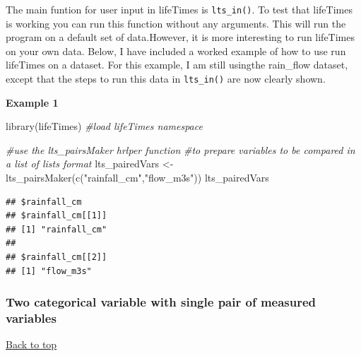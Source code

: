 \documentclass[
]{article}
\newenvironment{Shaded}{\begin{snugshade}}{\end{snugshade}}
\newcommand{\CommentTok}[1]{\textcolor[rgb]{0.56,0.35,0.01}{\textit{#1}}}
\newcommand{\FunctionTok}[1]{\textcolor[rgb]{0.00,0.00,0.00}{#1}}
\newcommand{\NormalTok}[1]{#1}
\newcommand{\OtherTok}[1]{\textcolor[rgb]{0.56,0.35,0.01}{#1}}
\newcommand{\StringTok}[1]{\textcolor[rgb]{0.31,0.60,0.02}{#1}}
\begin{document}
The main funtion for user input in lifeTimes is \texttt{lts\_in()}. To
test that lifeTimes is working you can run this function without any
arguments. This will run the program on a default set of data.However,
it is more interesting to run lifeTimes on your own data. Below, I have
included a worked example of how to use run lifeTimes on a dataset. For
this example, I am still usingthe rain\_flow dataset, except that the
steps to run this data in \texttt{lts\_in()} are now clearly shown.

\textbf{Example 1}

\begin{Shaded}
\begin{Highlighting}[]
\FunctionTok{library}\NormalTok{(lifeTimes) }\CommentTok{\#load lifeTimes namespace}

\CommentTok{\#use the lts\_pairsMaker hrlper function }
\CommentTok{\#to prepare variables to be compared in a list of lists format }
\NormalTok{lts\_pairedVars }\OtherTok{\textless{}{-}} \FunctionTok{lts\_pairsMaker}\NormalTok{(}\FunctionTok{c}\NormalTok{(}\StringTok{"rainfall\_cm"}\NormalTok{,}\StringTok{"flow\_m3s"}\NormalTok{))}
\NormalTok{lts\_pairedVars}
\end{Highlighting}
\end{Shaded}

\begin{verbatim}
## $rainfall_cm
## $rainfall_cm[[1]]
## [1] "rainfall_cm"
## 
## $rainfall_cm[[2]]
## [1] "flow_m3s"
\end{verbatim}

\hypertarget{two-categorical-variable-with-single-pair-of-measured-variables}{%
\subsubsection{\texorpdfstring{\textbf{Two categorical variable with
single pair of measured
variables}}{Two categorical variable with single pair of measured variables}}\label{two-categorical-variable-with-single-pair-of-measured-variables}}

\protect\hyperlink{}{Back to top}
\end{document}
